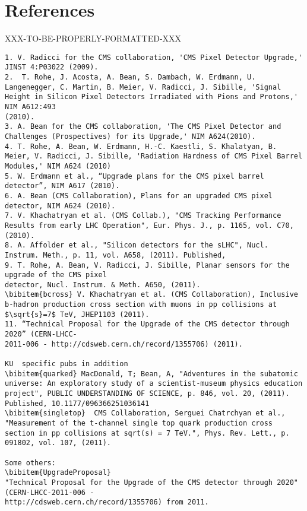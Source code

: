 \section*{References}

XXX-TO-BE-PROPERLY-FORMATTED-XXX

\begin{verbatim}
1. V. Radicci for the CMS collaboration, 'CMS Pixel Detector Upgrade,' JINST 4:P03022 (2009).
2.  T. Rohe, J. Acosta, A. Bean, S. Dambach, W. Erdmann, U. Langenegger, C. Martin, B. Meier, V. Radicci, J. Sibille, 'Signal Height in Silicon Pixel Detectors Irradiated with Pions and Protons,' NIM A612:493
(2010).
3. A. Bean for the CMS collaboration, 'The CMS Pixel Detector and Challenges (Prospectives) for its Upgrade,' NIM A624(2010).
4. T. Rohe, A. Bean, W. Erdmann, H.-C. Kaestli, S. Khalatyan, B. Meier, V. Radicci, J. Sibille, 'Radiation Hardness of CMS Pixel Barrel Modules,' NIM A624 (2010)
5. W. Erdmann et al., “Upgrade plans for the CMS pixel barrel detector”, NIM A617 (2010).
6. A. Bean (CMS Collaboration), Plans for an upgraded CMS pixel detector, NIM A624 (2010).
7. V. Khachatryan et al. (CMS Collab.), "CMS Tracking Performance Results from early LHC Operation", Eur. Phys. J., p. 1165, vol. C70,(2010).
8. A. Affolder et al., "Silicon detectors for the sLHC", Nucl. Instrum. Meth., p. 11, vol. A658, (2011). Published,
9. T. Rohe, A. Bean, V. Radicci, J. Sibille, Planar sensors for the upgrade of the CMS pixel
detector, Nucl. Instrum. & Meth. A650, (2011).
\bibitem{bcross} V. Khachatryan et al. (CMS Collaboration), Inclusive b-hadron production cross section with muons in pp collisions at $\sqrt{s}=7$ TeV, JHEP1103 (2011).
11. “Technical Proposal for the Upgrade of the CMS detector through 2020” (CERN-LHCC-
2011-006 - http://cdsweb.cern.ch/record/1355706) (2011).
 
KU  specific pubs in addition
\bibitem{quarked} MacDonald, T; Bean, A, "Adventures in the subatomic universe: An exploratory study of a scientist-museum physics education project", PUBLIC UNDERSTANDING OF SCIENCE, p. 846, vol. 20, (2011). Published, 10.1177/096366251036141
\bibitem{singletop}  CMS Collaboration, Serguei Chatrchyan et al., "Measurement of the t-channel single top quark production cross section in pp collisions at sqrt(s) = 7 TeV.", Phys. Rev. Lett., p. 091802, vol. 107, (2011).

Some others:
\bibitem{UpgradeProposal}
"Technical Proposal for the Upgrade of the CMS detector through 2020" (CERN-LHCC-2011-006 -
http://cdsweb.cern.ch/record/1355706) from 2011.

\end{verbatim}